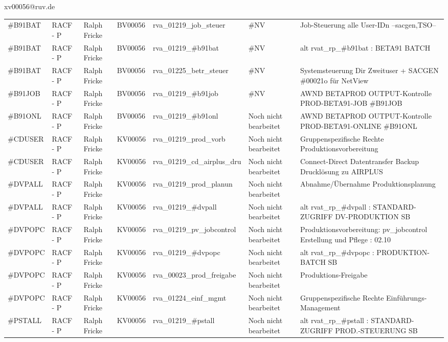 \documentclass[a4paper,landscape,12pt]{letter}
\begin{document}
\begin{letter}{xv00056@ruv.de\hfill \break}
\begin{tiny}
\begin{longtable}{|p{35mm}|p{15mm}|p{25mm}|p{10mm}|p{40mm}|p{50mm}|p{50mm}|}
\#B91BAT & RACF - P & Ralph Fricke & BV00056 & rva\_01219\_job\_steuer & \#NV & Job-Steuerung alle User-IDn --sacgen,TSO-- \\
\#B91BAT & RACF - P & Ralph Fricke & BV00056 & rva\_01219\_\#b91bat & \#NV & alt rvat\_rp\_\#b91bat          : BETA91 BATCH \\
\#B91BAT & RACF - P & Ralph Fricke & BV00056 & rva\_01225\_betr\_steuer & \#NV & Systemsteuerung Dir Zweituser + SACGEN \#00021o für NetView \\
\#B91JOB & RACF - P & Ralph Fricke & BV00056 & rva\_01219\_\#b91job & \#NV & AWND BETAPROD OUTPUT-Kontrolle PROD-BETA91-JOB \#B91JOB \\
\#B91ONL & RACF - P & Ralph Fricke & BV00056 & rva\_01219\_\#b91onl & Noch nicht bearbeitet & AWND BETAPROD OUTPUT-Kontrolle PROD-BETA91-ONLINE \#B91ONL \\
\#CDUSER & RACF - P & Ralph Fricke & KV00056 & rva\_01219\_prod\_vorb & Noch nicht bearbeitet & Gruppenspezifische Rechte Produktionsvorbereitung \\
\#CDUSER & RACF - P & Ralph Fricke & KV00056 & rva\_01219\_cd\_airplus\_dru & Noch nicht bearbeitet & Connect-Direct Datentransfer Backup Drucklösung zu AIRPLUS \\
\#DVPALL & RACF - P & Ralph Fricke & KV00056 & rva\_01219\_prod\_planun & Noch nicht bearbeitet & Abnahme/Übernahme Produktionsplanung \\
\#DVPALL & RACF - P & Ralph Fricke & KV00056 & rva\_01219\_\#dvpall & Noch nicht bearbeitet & alt rvat\_rp\_\#dvpall          : STANDARD-ZUGRIFF DV-PRODUKTION SB \\
\#DVPOPC & RACF - P & Ralph Fricke & KV00056 & rva\_01219\_pv\_jobcontrol & Noch nicht bearbeitet & Produktionsvorbereitung: pv\_jobcontrol Erstellung und Pflege : 02.10 \\
\#DVPOPC & RACF - P & Ralph Fricke & KV00056 & rva\_01219\_\#dvpopc & Noch nicht bearbeitet & alt rvat\_rp\_\#dvpopc          : PRODUKTION-BATCH SB \\
\#DVPOPC & RACF - P & Ralph Fricke & KV00056 & rva\_00023\_prod\_freigabe & Noch nicht bearbeitet & Produktions-Freigabe \\
\#DVPOPC & RACF - P & Ralph Fricke & KV00056 & rva\_01224\_einf\_mgmt & Noch nicht bearbeitet & Gruppenspezifische Rechte Einführungs-Management \\
\#PSTALL & RACF - P & Ralph Fricke & KV00056 & rva\_01219\_\#pstall & Noch nicht bearbeitet & alt rvat\_rp\_\#pstall          : STANDARD-ZUGRIFF PROD.-STEUERUNG SB \\

\end{longtable}
\end{tiny}
\end{letter}
\end{document}
